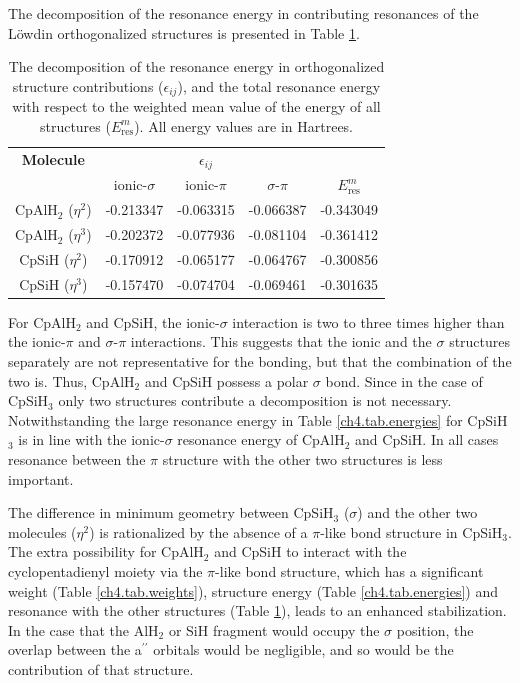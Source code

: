 The decomposition of the resonance energy in contributing resonances of the L\"{o}wdin orthogonalized structures \cite{havenith} is presented in Table \ref{ch4.tab.interactions}.
\begin{table}[htbp]
\caption{The decomposition of the resonance energy in orthogonalized structure contributions ($\epsilon_{ij}$), and the total resonance energy with respect to the weighted mean value of the energy of all structures ($E^m_\mathrm{res}$). All energy values are in Hartrees.}
\center
\begin{tabular}{|c|ccc|c|}
\hline
\textbf{Molecule}&\multicolumn{3}{c|}{$\epsilon_{ij}$}&\\
&ionic-$\sigma$&ionic-$\pi$&$\sigma$-$\pi$&$E^m_\mathrm{res}$\\
\hline
CpAlH$_2$ ($\eta^{2}$)&-0.213347&-0.063315&-0.066387&-0.343049\\
CpAlH$_2$ ($\eta^{3}$)&-0.202372&-0.077936&-0.081104&-0.361412\\
CpSiH ($\eta^{2}$)&-0.170912&-0.065177&-0.064767&-0.300856\\
CpSiH ($\eta^{3}$)&-0.157470&-0.074704&-0.069461&-0.301635\\
\hline
\end{tabular}
\label{ch4.tab.interactions}
\end{table}
For CpAlH$_2$ and CpSiH, the ionic-$\sigma$ interaction is two to three times higher than the ionic-$\pi$ and $\sigma$-$\pi$ interactions. This suggests that the ionic and the $\sigma$ structures separately are not representative for the bonding, but that the combination of the two is. Thus, CpAlH$_2$ and CpSiH possess a polar $\sigma$ bond. Since in the case of CpSiH$_3$ only two structures contribute a decomposition is not necessary. Notwithstanding the large resonance energy in Table \ref{ch4.tab.energies} for CpSiH$_3$ is in line with the ionic-$\sigma$ resonance energy of CpAlH$_2$ and CpSiH. In all cases resonance between the $\pi$ structure with the other two structures is less important.

The difference in minimum geometry between CpSiH$_3$ ($\sigma$) and the other two molecules ($\eta^2$) is rationalized by the absence of a $\pi$-like bond structure in CpSiH$_3$. The extra possibility for CpAlH$_2$ and CpSiH to interact with the cyclopentadienyl moiety via the $\pi$-like bond structure, which has a significant weight (Table \ref{ch4.tab.weights}), structure energy (Table \ref{ch4.tab.energies}) and resonance with the other structures (Table \ref{ch4.tab.interactions}), leads to an enhanced stabilization. In the case that the AlH$_2$ or SiH fragment would occupy the $\sigma$ position, the overlap between the a$^{\prime\prime}$ orbitals would be negligible, and so would be the contribution of that structure.  

